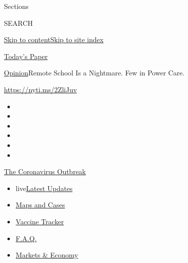 Sections

SEARCH

\protect\hyperlink{site-content}{Skip to
content}\protect\hyperlink{site-index}{Skip to site index}

\href{https://myaccount.nytimes.com/auth/login?response_type=cookie\&client_id=vi}{}

\href{https://www.nytimes.com/section/todayspaper}{Today's Paper}

\href{/section/opinion}{Opinion}\textbar{}Remote School Is a Nightmare.
Few in Power Care.

\href{https://nyti.ms/2ZliJuv}{https://nyti.ms/2ZliJuv}

\begin{itemize}
\item
\item
\item
\item
\item
\item
\end{itemize}

\href{https://www.nytimes.com/news-event/coronavirus?action=click\&pgtype=Article\&state=default\&region=TOP_BANNER\&context=storylines_menu}{The
Coronavirus Outbreak}

\begin{itemize}
\tightlist
\item
  live\href{https://www.nytimes.com/2020/08/08/world/coronavirus-updates.html?action=click\&pgtype=Article\&state=default\&region=TOP_BANNER\&context=storylines_menu}{Latest
  Updates}
\item
  \href{https://www.nytimes.com/interactive/2020/us/coronavirus-us-cases.html?action=click\&pgtype=Article\&state=default\&region=TOP_BANNER\&context=storylines_menu}{Maps
  and Cases}
\item
  \href{https://www.nytimes.com/interactive/2020/science/coronavirus-vaccine-tracker.html?action=click\&pgtype=Article\&state=default\&region=TOP_BANNER\&context=storylines_menu}{Vaccine
  Tracker}
\item
  \href{https://www.nytimes.com/interactive/2020/world/coronavirus-tips-advice.html?action=click\&pgtype=Article\&state=default\&region=TOP_BANNER\&context=storylines_menu}{F.A.Q.}
\item
  \href{https://www.nytimes.com/live/2020/08/07/business/stock-market-today-coronavirus?action=click\&pgtype=Article\&state=default\&region=TOP_BANNER\&context=storylines_menu}{Markets
  \& Economy}
\end{itemize}

